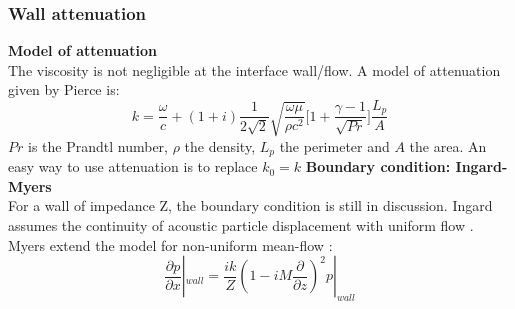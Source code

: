 \subsubsection{Wall attenuation}
\textbf{Model of attenuation}\\
The viscosity is not negligible at the interface wall/flow. A model of attenuation given by Pierce \cite{Pierce} is:
\begin{equation} 
    k=\frac{\omega}{c}+(1+i)\frac{1}{2\sqrt{2}}\sqrt{\frac{\omega\mu}{\rho c^2}}\Bigg[1+\frac{\gamma -1}{\sqrt{Pr}}\Bigg]\frac{L_p}{A}
\end{equation}
$Pr$ is the Prandtl number, $\rho$ the density, $L_p$ the perimeter and $A$ the area. An easy way to use attenuation is to replace $k_0=k$\smallbreak
\noindent\textbf{Boundary condition: Ingard-Myers}\\
For a wall of impedance Z, the boundary condition is still in discussion. Ingard assumes the continuity of acoustic particle displacement with uniform flow \cite{Ingard}. Myers extend the model for non-uniform mean-flow \cite{Myers}:
\begin{equation} 
    \label{eq:Myers}
    \frac{\partial p}{\partial x}|_{wall}=\frac{ik}{Z}(1-iM\frac{\partial}{\partial z})^2 p|_{wall}
\end{equation}
